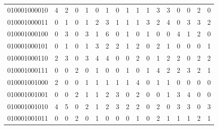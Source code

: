 \documentclass[10pt,a4paper]{article}
\begin{document}
\begin{longtable}{ |c|c|c|c|c|c|c|c|c|c|c|c|c|c|c|c|c| }
    010001000010              & 4                            & 2                                & 0                            & 1                              & 0   & 1   & 0   & 1   & 1   & 1   & 3   & 3   & 0   & 0   & 2   & 0   \\
    010001000011              & 0                            & 1                                & 0                            & 1                              & 2   & 3   & 1   & 1   & 1   & 3   & 2   & 4   & 0   & 3   & 3   & 2   \\
    010001000100              & 0                            & 3                                & 0                            & 3                              & 1   & 6   & 0   & 1   & 0   & 1   & 0   & 0   & 4   & 1   & 2   & 0   \\
    010001000101              & 0                            & 1                                & 0                            & 1                              & 3   & 2   & 2   & 1   & 2   & 0   & 2   & 1   & 0   & 0   & 0   & 1   \\
    010001000110              & 2                            & 3                                & 0                            & 3                              & 4   & 4   & 0   & 0   & 2   & 0   & 1   & 2   & 2   & 0   & 2   & 2   \\
    010001000111              & 0                            & 0                                & 2                            & 0                              & 1   & 0   & 0   & 1   & 0   & 1   & 4   & 2   & 2   & 3   & 2   & 1   \\
    010001001000              & 2                            & 0                                & 0                            & 1                              & 1   & 1   & 1   & 1   & 4   & 0   & 1   & 1   & 0   & 0   & 0   & 0   \\
    010001001001              & 0                            & 0                                & 2                            & 1                              & 1   & 2   & 3   & 0   & 2   & 0   & 0   & 1   & 3   & 4   & 0   & 0   \\
    010001001010              & 4                            & 5                                & 0                            & 2                              & 1   & 2   & 3   & 2   & 2   & 0   & 2   & 0   & 3   & 3   & 0   & 3   \\
    010001001011              & 0                            & 0                                & 2                            & 0                              & 1   & 0   & 0   & 0   & 1   & 0   & 2   & 1   & 1   & 1   & 2   & 1   \\

\end{longtable}
\end{document}
